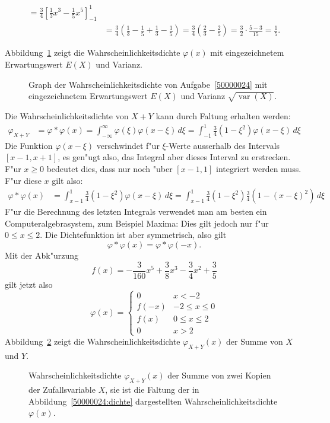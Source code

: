 \begin{loesung}
\begin{teilaufgaben}
\begin{align*}
=\frac34\left[\frac13x^3-\frac15x^5\right]_{-1}^1\\
&=\frac34\left(\frac13-\frac15+\frac13-\frac15\right)
=\frac34\left(\frac23-\frac25\right)
=\frac32\cdot\frac{5-3}{15}=\frac15.
\end{align*}
\item 
Abbildung~\ref{50000024:exvarx} zeigt die Wahrscheinlichkeitsdichte $\varphi(x)$
mit eingezeichnetem Erwartungswert $E(X)$ und Varianz.
\begin{figure}
\centering
{}
\caption{Graph der Wahrscheinlichkeitsdichte von Aufgabe~\ref{50000024} mit
eingezeichnetem Erwartungswert $E(X)$ und Varianz $\sqrt{\operatorname{var}(X)}$.
\label{50000024:exvarx}}
\end{figure}
\item
Die Wahrscheinlichkeitsdichte von $X+Y$ kann durch Faltung erhalten werden:
\begin{align*}
\varphi_{X+Y}&=\varphi*\varphi(x)
=\int_{-\infty}^{\infty}\varphi(\xi)\varphi(x-\xi)\,d\xi
=\int_{-1}^1\frac34(1-\xi^2)\varphi(x-\xi)\,d\xi
\end{align*}
Die Funktion $\varphi(x-\xi)$ verschwindet f"ur $\xi$-Werte ausserhalb
des Intervals $[x-1,x+1]$, es gen"ugt also, das Integral aber dieses
Interval zu erstrecken. F"ur $x\ge 0$ bedeutet dies, dass nur noch
"uber $[x-1,1]$ integriert werden muss. F"ur diese $x$ gilt also:
\begin{align*}
\varphi*\varphi(x)
&=
\int_{x-1}^1 \frac34(1-\xi^2)\varphi(x-\xi)\,d\xi
=
\int_{x-1}^1 \frac34(1-\xi^2)\frac34(1-(x-\xi)^2)\,d\xi
\end{align*}
F"ur die Berechnung des letzten Integrals verwendet man am besten
ein Computeralgebrasystem, zum Beispiel Maxima:
Dies gilt jedoch nur f"ur $0\le x \le 2$. Die Dichtefunktion ist
aber symmetrisch, also gilt
\[
\varphi*\varphi(x)=\varphi*\varphi(-x).
\]
Mit der Abk"urzung
\[
f(x)=-\frac3{160}x^5+\frac38x^3-\frac34x^2+\frac35
\]
gilt jetzt also
\[
\varphi(x)=\begin{cases}
0&x<-2\\
f(-x)&-2\le x\le 0\\
f(x)&0\le x \le 2\\
0&x>2
\end{cases}
\]
Abbildung~\ref{50000024:summe} zeigt die Wahrscheinlichkeitsdichte $\varphi_{X+Y}(x)$
der Summe von $X$ und $Y$.
\begin{figure}
\centering
{}
\caption{Wahrscheinlichkeitsdichte $\varphi_{X+Y}(x)$ der Summe von zwei Kopien
der Zufallsvariable $X$, sie ist die Faltung der in Abbildung~\ref{50000024:dichte}
dargestellten Wahrscheinlichkeitsdichte $\varphi(x)$.
\label{50000024:summe}}
\end{figure}
\end{teilaufgaben}
\end{loesung}

